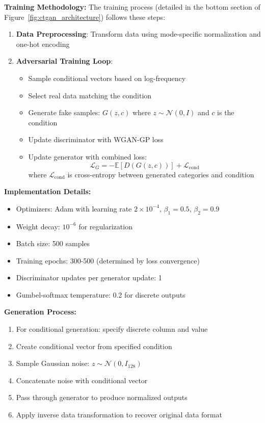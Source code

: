 \documentclass[conference]{IEEEtran}
\begin{document}
\textbf{Training Methodology:} The training process (detailed in the bottom section of Figure~\ref{fig:ctgan_architecture}) follows these steps:
\begin{enumerate}
    \item \textbf{Data Preprocessing}: Transform data using mode-specific normalization and one-hot encoding
    \item \textbf{Adversarial Training Loop}:
    \begin{itemize}
        \item Sample conditional vectors based on log-frequency
        \item Select real data matching the condition
        \item Generate fake samples: $G(z, c)$ where $z \sim \mathcal{N}(0, I)$ and $c$ is the condition
        \item Update discriminator with WGAN-GP loss
        \item Update generator with combined loss:
        \begin{equation}
        \mathcal{L}_G = -\mathbb{E}[D(G(z,c))] + \mathcal{L}_{\text{cond}}
        \end{equation}
        where $\mathcal{L}_{\text{cond}}$ is cross-entropy between generated categories and condition
    \end{itemize}
\end{enumerate}

\textbf{Implementation Details:}
\begin{itemize}
    \item Optimizers: Adam with learning rate $2 \times 10^{-4}$, $\beta_1 = 0.5$, $\beta_2 = 0.9$
    \item Weight decay: $10^{-6}$ for regularization
    \item Batch size: 500 samples
    \item Training epochs: 300-500 (determined by loss convergence)
    \item Discriminator updates per generator update: 1
    \item Gumbel-softmax temperature: 0.2 for discrete outputs
\end{itemize}

\textbf{Generation Process:}
\begin{enumerate}
    \item For conditional generation: specify discrete column and value
    \item Create conditional vector from specified condition
    \item Sample Gaussian noise: $z \sim \mathcal{N}(0, I_{128})$
    \item Concatenate noise with conditional vector
    \item Pass through generator to produce normalized outputs
    \item Apply inverse data transformation to recover original data format
\end{enumerate}
\end{document}

